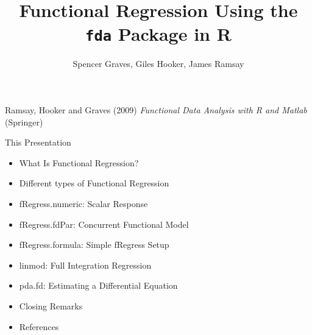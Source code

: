 \documentclass[compress]{beamer}
\begin{document}

\title{
Functional Regression \newline
Using the \texttt{fda} Package in R}
\author{Spencer Graves, Giles Hooker, James Ramsay}

\date{}




\begin{frame}

\maketitle

Ramsay, Hooker and Graves (2009)
\emph{Functional Data Analysis with R and Matlab}
(Springer)

\end{frame}


\begin{frame}{This Presentation}

\begin{itemize}
\item What Is Functional Regression?

\item Different types of Functional Regression

\item fRegress.numeric:  Scalar Response

\item fRegress.fdPar:  Concurrent Functional Model

\item fRegress.formula:  Simple fRegress Setup

\item linmod:  Full Integration Regression

\item pda.fd:  Estimating a Differential Equation

\item Closing Remarks

\item References

\end{itemize}

\end{frame}
\end{document}
